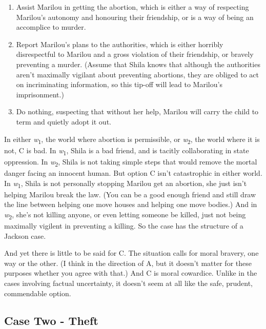 \documentclass[
  10pt,
  letterpaper,
  twoside]{scrbook}
\providecommand{\tightlist}{%
  \setlength{\itemsep}{0pt}\setlength{\parskip}{0pt}}\usepackage{longtable,booktabs,array}
\begin{document}
\begin{enumerate}
\def\labelenumi{\arabic{enumi}.}
\tightlist
\item
  Assist {Marilou} in getting the abortion, which is either a way of
  respecting {Marilou}'s autonomy and honouring their friendship, or is
  a way of being an accomplice to murder.
\item
  Report {Marilou}'s plans to the authorities, which is either horribly
  disrespectful to {Marilou} and a gross violation of their friendship,
  or bravely preventing a murder. (Assume that Shila knows that although
  the authorities aren't maximally vigilant about preventing abortions,
  they are obliged to act on incriminating information, so this tip-off
  will lead to Marilou's imprisonment.)
\item
  Do nothing, suspecting that without her help, {Marilou} will carry the
  child to term and quietly adopt it out.
\end{enumerate}

In either \emph{w}\textsubscript{1}, the world where abortion is
permissible, or \emph{w}\textsubscript{2}, the world where it is not, C
is bad. In \emph{w}\textsubscript{1}, {Shila} is a bad friend, and is
tacitly collaborating in state oppression. In \emph{w}\textsubscript{2},
{Shila} is not taking simple steps that would remove the mortal danger
facing an innocent human. But option C isn't catastrophic in either
world. In \emph{w}\textsubscript{1}, {Shila} is not personally stopping
{Marilou} get an abortion, she just isn't helping {Marilou} break the
law. (You can be a good enough friend and still draw the line between
helping one move houses and helping one move bodies.) And in
\emph{w}\textsubscript{2}, she's not killing anyone, or even letting
someone be killed, just not being maximally vigilent in preventing a
killing. So the case has the structure of a Jackson case.

And yet there is little to be said for C. The situation calls for moral
bravery, one way or the other. (I think in the direction of A, but it
doesn't matter for these purposes whether you agree with that.) And C is
moral cowardice. Unlike in the cases involving factual uncertainty, it
doesn't seem at all like the safe, prudent, commendable option.

\subsection{Case Two - Theft}\label{casetwo-theft}
\end{document}
